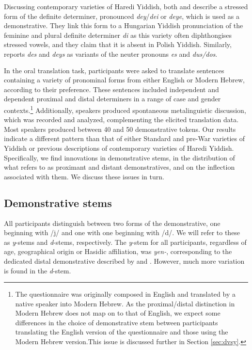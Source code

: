 \documentclass[output=paper, hidelinks]{langscibook}
\begin{document}
Discussing contemporary varieties of Haredi Yiddish, both \citet[58]{Assouline14} and \citet[95]{Sadock18} describe a stressed form of the definite determiner, pronounced \textit{dey}/\textit{dei} or \textit{deye}, which is used as a demonstrative. They link this form to a Hungarian Yiddish pronunciation of the feminine and plural definite determiner \textit{di} as this variety often diphthongises stressed vowels, and they claim that it is absent in Polish Yiddish. Similarly, \citet{Krogh12} reports \textit{des} and \textit{deys} as variants of the neuter pronouns \textit{es} and \textit{dus/dos}. 

In the oral translation task, participants were asked to translate sentences containing a variety of pronominal forms from either English or Modern Hebrew, according to their preference. These sentences included independent and dependent proximal and distal determiners in a range of case and gender contexts.\footnote{The questionnaire was originally composed in English and translated by a native speaker into Modern Hebrew. As the proximal/distal distinction in Modern Hebrew does not map on to that of English, we expect some differences in the choice of demonstrative stem between participants translating the English version of the questionnaire and those using the Modern Hebrew version.This issue is discussed further in Section \ref{sec:dvsy}.} Additionally, speakers produced spontaneous metalinguistic discussion, which was recorded and analyzed, complementing the elicited translation data. Most speakers produced between 40 and 50 demonstrative tokens. Our results indicate a different pattern than that of either Standard and pre-War varieties of Yiddish or previous descriptions of contemporary varieties of Haredi Yiddish. Specifically, we find innovations in demonstrative stems, in the distribution of what \citet{Jacobs05} refers to as proximant and distant demonstratives, and on the inflection associated with them. We discuss these issues in turn.

\subsection{Demonstrative stems}\label{sec:d-stem}

All participants distinguish between two forms of the demonstrative, one beginning with /j/ and one with one beginning with /d/. We will refer to these as \textit{y}-stems and \textit{d}-stems, respectively. The \textit{y}-stem for all participants, regardless of age, geographical origin or Hasidic affiliation, was \textit{yen-}, corresponding to the dedicated distal demonstrative described by \citet{Katz87} and \citet{Jacobs05}. However, much more variation is found in the \textit{d}-stem. 
\end{document}
